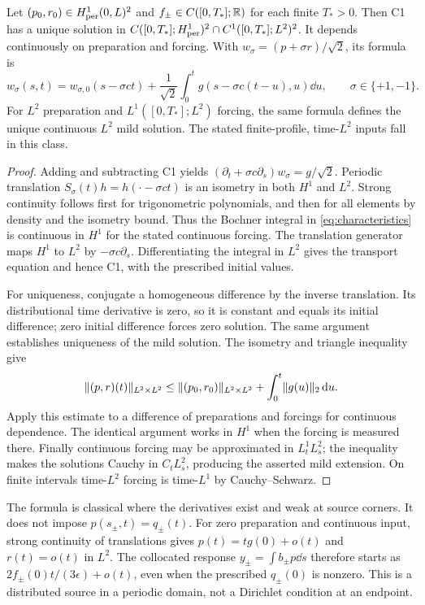 \begin{theorem}\label{thm:wellposed}
Let $(p_0,r_0)\in H^1_{\rm per}(0,L)^2$ and $f_\pm\in C([0,T_*];\mathbb R)$ for each finite $T_*>0$. Then C1 has a unique solution in
$C([0,T_*];H^1_{\rm per})^2\cap C^1([0,T_*];L^2)^2$. It depends continuously on preparation and forcing. With $w_\sigma=(p+\sigma r)/\sqrt2$, its formula is
\begin{equation}\label{eq:characteristics}
 w_\sigma(s,t)=w_{\sigma,0}(s-\sigma ct)
 +\frac1{\sqrt2}\int_0^t g(s-\sigma c(t-u),u)\dd u,
 \qquad\sigma\in\{+1,-1\}.
\end{equation}
For $L^2$ preparation and $L^1([0,T_*];L^2)$ forcing, the same formula defines the unique continuous $L^2$ mild solution. The stated finite-profile, time-$L^2$ inputs fall in this class.
\end{theorem}
\begin{proof}
Adding and subtracting C1 yields $(\partial_t+\sigma c\partial_s)w_\sigma=g/\sqrt2$. Periodic translation $S_\sigma(t)h=h(\cdot-\sigma ct)$ is an isometry in both $H^1$ and $L^2$. Strong continuity follows first for trigonometric polynomials, and then for all elements by density and the isometry bound. Thus the Bochner integral in \eqref{eq:characteristics} is continuous in $H^1$ for the stated continuous forcing. The translation generator maps $H^1$ to $L^2$ by $-\sigma c\partial_s$. Differentiating the integral in $L^2$ gives the transport equation and hence C1, with the prescribed initial values.

For uniqueness, conjugate a homogeneous difference by the inverse translation. Its distributional time derivative is zero, so it is constant and equals its initial difference; zero initial difference forces zero solution. The same argument establishes uniqueness of the mild solution. The isometry and triangle inequality give
\[
 \lVert(p,r)(t)\rVert_{L^2\times L^2}
 \le \lVert(p_0,r_0)\rVert_{L^2\times L^2}+\int_0^t\lVert g(u)\rVert_2\,\mathrm d u.
\]
Apply this estimate to a difference of preparations and forcings for continuous dependence. The identical argument works in $H^1$ when the forcing is measured there. Finally continuous forcing may be approximated in $L^1_tL^2_s$; the inequality makes the solutions Cauchy in $C_tL^2_s$, producing the asserted mild extension. On finite intervals time-$L^2$ forcing is time-$L^1$ by Cauchy--Schwarz.
\end{proof}

The formula is classical where the derivatives exist and weak at source corners. It does not impose $p(s_\pm,t)=q_\pm(t)$. For zero preparation and continuous input, strong continuity of translations gives $p(t)=tg(0)+o(t)$ and $r(t)=o(t)$ in $L^2$. The collocated response $y_\pm=\int b_\pm p\dd s$ therefore starts as $2f_\pm(0)t/(3\epsilon)+o(t)$, even when the prescribed $q_\pm(0)$ is nonzero. This is a distributed source in a periodic domain, not a Dirichlet condition at an endpoint.

